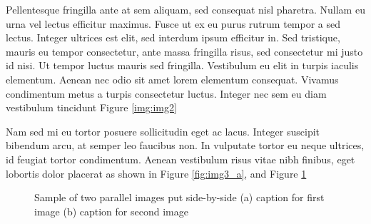 Pellentesque fringilla ante at sem aliquam, sed consequat nisl pharetra. Nullam eu urna vel lectus efficitur maximus. Fusce ut ex eu purus rutrum tempor a sed lectus. Integer ultrices est elit, sed interdum ipsum efficitur in. Sed tristique, mauris eu tempor consectetur, ante massa fringilla risus, sed consectetur mi justo id nisi. Ut tempor luctus mauris sed fringilla. Vestibulum eu elit in turpis iaculis elementum. Aenean nec odio sit amet lorem elementum consequat. Vivamus condimentum metus a turpis consectetur luctus. Integer nec sem eu diam vestibulum tincidunt Figure \ref{img:img2}

Nam sed mi eu tortor posuere sollicitudin eget ac lacus. Integer suscipit bibendum arcu, at semper leo faucibus non. In vulputate tortor eu neque ultrices, id feugiat tortor condimentum. Aenean vestibulum risus vitae nibh finibus, eget lobortis dolor placerat as shown in Figure \ref{fig:img3_a}, and Figure \ref{fig:img3}
%
\begin{figure}[t!]
\centering
    \hfill
    \caption{Sample of two parallel images put side-by-side (a) caption for first image (b) caption for second image}
    \label{fig:img3}
\end{figure}


